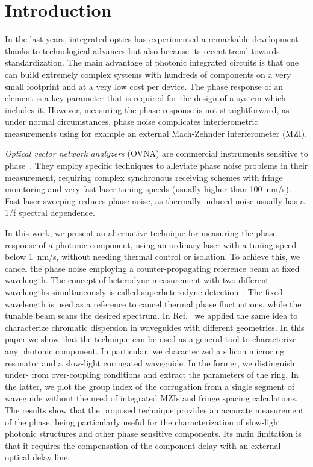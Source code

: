 \section{Introduction}
\noindent In the last years, integrated optics has experimented a remarkable development thanks to technological advances but also because its recent trend towards standardization.
The main advantage of photonic integrated circuits is that one can build extremely complex systems with hundreds of components on a very small footprint and at a very low cost per device.
The phase response of an element is a key parameter that is required for the design of a system which includes it.
However, measuring the phase response is not straightforward, as under normal circumstances, phase noise complicates interferometric measurements using for example an external Mach-Zehnder interferometer (MZI).

\emph{Optical vector network analyzers} (OVNA) are commercial instruments sensitive to phase~\cite{Vanwiggeren2003, Gifford2005}.
They employ specific techniques to alleviate phase noise problems in their measurement, requiring complex synchronous receiving schemes with fringe monitoring and very fast laser tuning speeds (usually higher than 100~nm/s).
Fast laser sweeping reduces phase noise, as thermally-induced noise usually has a 1/f spectral dependence.


In this work, we present an alternative technique for measuring the phase response of a photonic component, using an ordinary laser with a tuning speed below 1~nm/s, without needing thermal control or isolation.
To achieve this, we cancel the phase noise employing a counter-propagating reference beam at fixed wavelength.
The concept of heterodyne measurement with two different wavelengths simultaneously is called superheterodyne detection~\cite{Dandliker1988}.
The fixed wavelength is used as a reference to cancel thermal phase fluctuations, while the tunable beam scans the desired spectrum.
In Ref.~\cite{Mas2012} we applied the same idea to characterize chromatic dispersion in waveguides with different geometries.
In this paper we show that the technique can be used as a general tool to characterize any photonic component.
In particular, we characterized a silicon microring resonator and a slow-light corrugated waveguide.
In the former, we distinguish under- from over-coupling conditions and extract the parameters of the ring.
In the latter, we plot the group index of the corrugation from a single segment of waveguide without the need of integrated MZIs and fringe spacing calculations.
The results show that the proposed technique provides an accurate measurement of the phase, being particularly useful for the characterization of slow-light photonic structures and other phase sensitive components.
Its main limitation is that it requires the compensation of the component delay with an external optical delay line.


